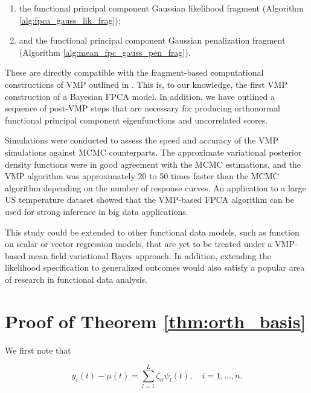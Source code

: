 \documentclass[12pt]{article}
\theoremstyle{plain}
\theoremstyle{definition}
\theoremstyle{remark}
\begin{document}
\begin{enumerate}
	\item the functional principal component Gaussian likelihood fragment (Algorithm \ref{alg:fpca_gauss_lik_frag});
	\item and the functional principal component Gaussian penalization fragment (Algorithm \ref{alg:mean_fpc_gauss_pen_frag}).
\end{enumerate}

\noindent These are directly compatible with the fragment-based computational constructions of VMP outlined in
. This is, to our knowledge, the first VMP construction of a Bayesian FPCA model. In addition,
we have outlined a sequence of post-VMP steps that are necessary for producing orthonormal functional
principal component eigenfunctions and uncorrelated scores.

Simulations were conducted to assess the speed and accuracy of the VMP simulations against MCMC
counterparts. The approximate variational  posterior density functions were in good agreement with the
MCMC estimations, and the VMP algorithm was approximately 20 to 50 times faster than the MCMC
algorithm depending on the number of response curves. An application to a large US temperature dataset
showed that the VMP-based FPCA algorithm can be used for strong inference in big data applications.

This study could be extended to other
functional data models, such as function on scalar or vector regression models, that are yet to be treated
under a VMP-based mean field variational Bayes approach. In addition, extending the likelihood specification to
generalized outcomes would also satisfy a popular area of research in functional data analysis.





\appendix


\section{Proof of Theorem \ref{thm:orth_basis}}
\label{app:proof_thm_orth_basis}

We first note that

\begin{equation}
	y_i (t) - \mu (t) = \sum_{l=1}^L \zeta_{il} \psi_l (t), \quad i = 1, \dots, n.
\label{centered_kl_expansion}
\end{equation}
\end{document}
